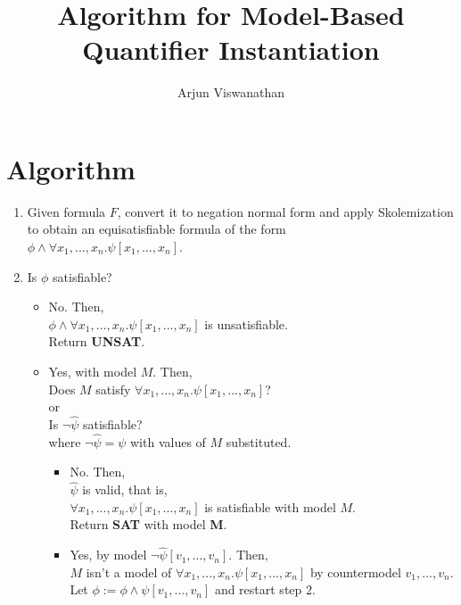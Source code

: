\documentclass{article}
\begin{document}
\title{Algorithm for Model-Based Quantifier Instantiation}
\author{Arjun Viswanathan}
\date{}
\maketitle

\section{Algorithm}
	\begin{enumerate}
		\item Given formula $F$, convert it to negation 
		normal form and apply Skolemization to obtain an 
		equisatisfiable formula of the form\\
		$\phi \land \forall x_1, ..., x_n. \psi [x_1, ..., x_n]$.
		\item Is $\phi$ satisfiable?
		\begin{itemize}
			\item No. Then, \\ 
			$\phi \land \forall x_1, ..., x_n. \psi [x_1, ..., x_n]$ is unsatisfiable.\\
			Return \textbf{UNSAT}.
			\item Yes, with model $M$. Then, \\
			Does $M$ satisfy $\forall x_1, ..., x_n. \psi [x_1, ..., x_n]$?\\
			or\\
			Is $\neg\hat{\psi}$ satisfiable?\\
			where $\neg\hat{\psi} = \psi$ with values of $M$
			substituted.
			\begin{itemize}
				\item No. Then, \\
				$\hat{\psi}$ is valid, that is, \\
				$\forall x_1, ..., x_n. \psi [x_1, ..., x_n]$ is satisfiable with model $M$.\\
				Return \textbf{SAT} with model \textbf{M}.
				\item Yes, by model $\neg\hat{\psi}[v_1, ..., v_n]$. Then,\\ 
				$M$ isn't a model of 
				$\forall x_1, ..., x_n. \psi [x_1, ..., x_n]$
				by countermodel $v_1, ..., v_n$.\\
				Let $\phi := \phi \land \psi[v_1, ..., v_n]$
				and restart step $2$.
			\end{itemize}
		\end{itemize}
	\end{enumerate}
\end{document}
